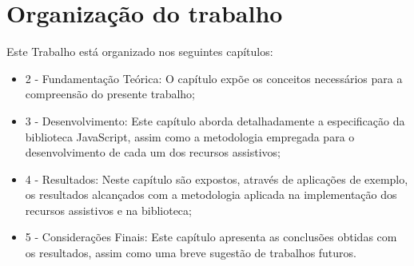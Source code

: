 
\section{Organização do trabalho}

Este Trabalho está organizado nos seguintes capítulos:

\begin{itemize}
    \item 2 - Fundamentação Teórica: O capítulo expõe os conceitos necessários para a compreensão do presente trabalho;
    \item 3 - Desenvolvimento: Este capítulo aborda detalhadamente a especificação da biblioteca JavaScript, assim como a metodologia empregada para o desenvolvimento de cada um dos recursos assistivos;
    \item 4 - Resultados: Neste capítulo são expostos, através de aplicações de exemplo, os resultados alcançados com a metodologia aplicada na implementação dos recursos assistivos e na biblioteca;
    \item 5 - Considerações Finais: Este capítulo apresenta as conclusões obtidas com os resultados, assim como uma breve sugestão de trabalhos futuros.
\end{itemize}

